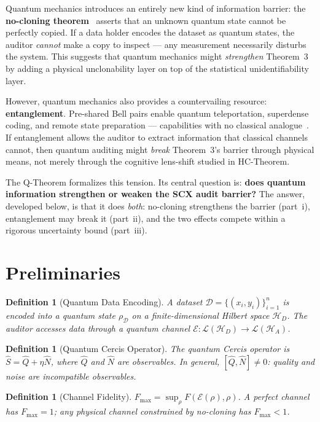 \documentclass[12pt,a4paper]{article}
\newtheorem{definition}[theorem]{Definition}
\newcommand{\cD}{\mathcal{D}}
\newcommand{\cH}{\mathcal{H}}
\newcommand{\cL}{\mathcal{L}}
\newcommand{\cE}{\mathcal{E}}
\begin{document}
Quantum mechanics introduces an entirely new kind of information barrier: the
\textbf{no-cloning theorem}~\citep{wootters1982single} asserts that an unknown
quantum state cannot be perfectly copied.  If a data holder encodes the dataset
as quantum states, the auditor \emph{cannot} make a copy to inspect --- any
measurement necessarily disturbs the system.  This suggests that quantum
mechanics might \emph{strengthen} Theorem~3 by adding a physical
unclonability layer on top of the statistical unidentifiability layer.

However, quantum mechanics also provides a countervailing resource:
\textbf{entanglement}.  Pre-shared Bell pairs enable quantum teleportation,
superdense coding, and remote state preparation --- capabilities with no
classical analogue~\citep{nielsen2010quantum}.  If entanglement allows the
auditor to extract information that classical channels cannot, then quantum
auditing might \emph{break} Theorem~3's barrier through physical means, not
merely through the cognitive lens-shift studied in HC-Theorem.

The Q-Theorem formalizes this tension.  Its central question is: \textbf{does
quantum information strengthen or weaken the SCX audit barrier?}  The answer,
developed below, is that it does \emph{both}: no-cloning strengthens the
barrier (part~i), entanglement may break it (part~ii), and the two effects
compete within a rigorous uncertainty bound (part~iii).

\section{Preliminaries}

\begin{definition}[Quantum Data Encoding]
\label{def:quantum-encoding}
A dataset $\cD=\{(x_i,y_i)\}_{i=1}^n$ is encoded into a quantum state $\rho_{\cD}$ on a finite-dimensional Hilbert space $\cH_D$. The auditor accesses data through a quantum channel $\cE: \cL(\cH_D) \to \cL(\cH_A)$.
\end{definition}

\begin{definition}[Quantum Cercis Operator]
\label{def:quantum-cercis}
The quantum Cercis operator is $\hat{S} = \hat{Q} + \eta \hat{N}$, where $\hat{Q}$ and $\hat{N}$ are observables. In general, $[\hat{Q},\hat{N}]\neq0$: quality and noise are incompatible observables.
\end{definition}

\begin{definition}[Channel Fidelity]
\label{def:channel-fidelity}
$F_{\max} = \sup_{\rho} F(\cE(\rho),\rho)$. A perfect channel has $F_{\max}=1$; any physical channel constrained by no-cloning has $F_{\max}<1$.
\end{definition}
\end{document}
